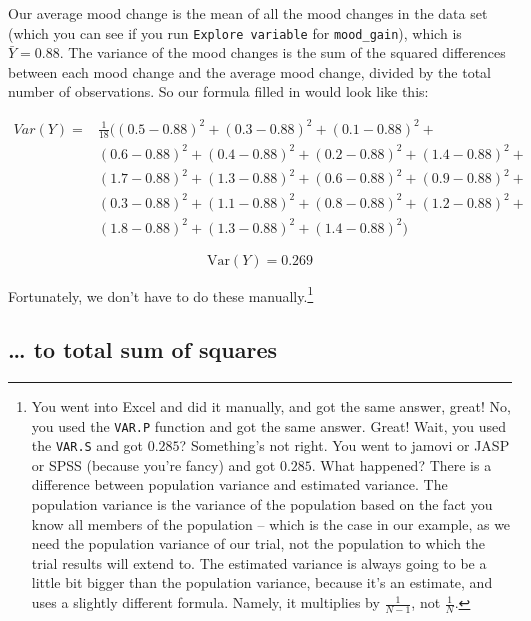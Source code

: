 \documentclass[
]{book}
\theoremstyle{definition}
\theoremstyle{definition}
\theoremstyle{definition}
\theoremstyle{definition}
\theoremstyle{remark}
\begin{document}
Our average mood change is the mean of all the mood changes in the data set (which you can see if you run \texttt{Explore\ variable} for \texttt{mood\_gain}), which is \(\bar{Y} = 0.88\). The variance of the mood changes is the sum of the squared differences between each mood change and the average mood change, divided by the total number of observations. So our formula filled in would look like this:

\[
\begin{array}{ll}
{Var}(Y) =& \frac{1}{18} ( (0.5 - 0.88 )^2 + (0.3 -0.88 )^2 + (0.1 - 0.88 )^2 + \\
 & (0.6 - 0.88 )^2 + (0.4 - 0.88 )^2 + (0.2 - 0.88 )^2 + (1.4 - 0.88 )^2 + \\
 & (1.7 - 0.88 )^2 + (1.3 - 0.88 )^2 + (0.6 - 0.88 )^2 + (0.9 - 0.88 )^2 + \\
 & (0.3 - 0.88 )^2 + (1.1 - 0.88 )^2 + (0.8 - 0.88 )^2 + (1.2 - 0.88 )^2 + \\
 & (1.8 - 0.88 )^2 + (1.3 - 0.88 )^2 + (1.4 - 0.88 )^2 )
\end{array}
\]

\[
\mbox{Var}(Y) = 0.269
\]

Fortunately, we don't have to do these manually.\footnote{You went into Excel and did it manually, and got the same answer, great! No, you used the \texttt{VAR.P} function and got the same answer. Great! Wait, you used the \texttt{VAR.S} and got \(0.285\)? Something's not right. You went to jamovi or JASP or SPSS (because you're fancy) and got \(0.285\). What happened? There is a difference between population variance and estimated variance. The population variance is the variance of the population based on the fact you know all members of the population -- which is the case in our example, as we need the population variance of our trial, not the population to which the trial results will extend to. The estimated variance is always going to be a little bit bigger than the population variance, because it's an estimate, and uses a slightly different formula. Namely, it multiplies by \(\frac{1}{N-1}\), not \(\frac{1}{N}\).}

\hypertarget{to-total-sum-of-squares}{%
\subsection{\ldots{} to total sum of squares}\label{to-total-sum-of-squares}}
\end{document}
